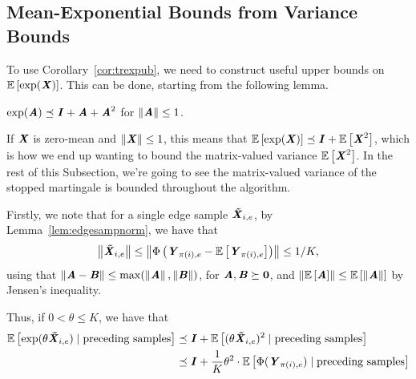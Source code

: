
\subsection{Mean-Exponential Bounds from Variance Bounds}
To use Corollary~\ref{cor:trexpub}, we need to construct useful upper
bounds on $\E{\exp(\XX)}$.
This can be done, starting from the following lemma.
\begin{lemma}\label{lem:ineq_exp}
  $\exp(\AA) \preceq \II + \AA + \AA^2$ for $\|\AA\|\leq1$.
\end{lemma}
If $\XX$ is zero-mean and $\norm{\XX} \leq 1$,
this means that $\E{\exp(\XX)} \preceq \II + \E{\XX^2}$,
which is how we end up wanting to bound the matrix-valued variance $\E{\XX^2}$.
In the rest of this Subsection, we're going to see the matrix-valued variance of the stopped
martingale is bounded throughout the algorithm.

Firstly, we note that for a single edge sample $\XXtil_{i,e}$,
by Lemma~\ref{lem:edgesampnorm}, we have that
\[
  \norm{\XXtil_{i,e}} \leq
  \norm{\Phi\left( \YY_{\pi(i),e} - \E{\YY_{\pi(i),e}} \right)}
    \leq 1/K,
\]
using that $\norm{\AA-\BB} \leq \max( \norm{\AA}, \norm{\BB} )$, for
$\AA, \BB \succeq \matzero$, and $\norm{\E{\AA}} \leq \E{\norm{\AA}}$
by Jensen's inequality.

Thus, if $0 < \theta \leq K$, we have that
\begin{align}
  \label{eq:edgelogexp}
  \E{ \exp(\theta \XXtil_{i,e}) \mid \text{preceding samples} }
  &\preceq
      \II +
    \E{(\theta \XXtil_{i,e})^2 \mid \text{preceding samples} }
  \\ \nonumber   &\preceq
        \II +
    \frac{1}{K}\theta^2\cdot
    \E{\Phi(\YY_{\pi(i),e}) \mid \text{preceding samples} }
\end{align}




